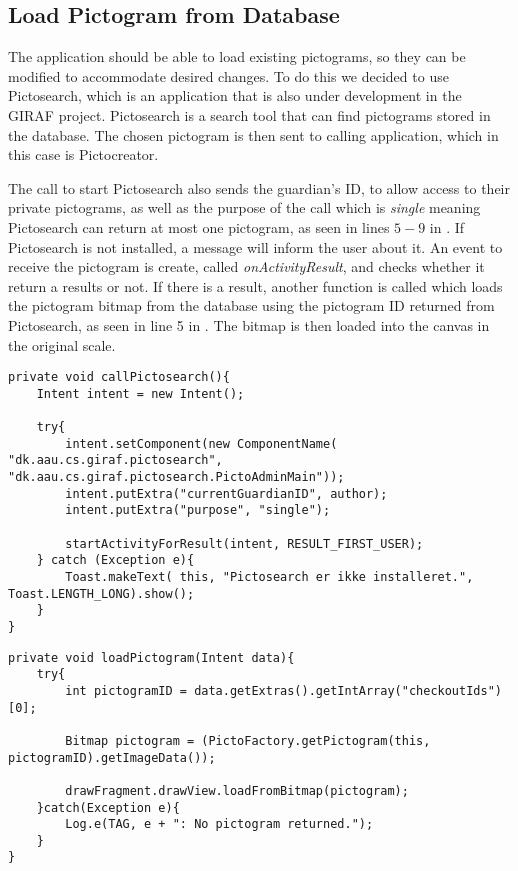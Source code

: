 \subsection{Load Pictogram from Database}
The application should be able to load existing pictograms, so they can be modified to accommodate desired changes.
To do this we decided to use Pictosearch, which is an application that is also under development in the GIRAF project.
Pictosearch is a search tool that can find pictograms stored in the database.
The chosen pictogram is then sent to calling application, which in this case is Pictocreator.

The call to start Pictosearch also sends the guardian's ID, to allow access to their private pictograms, as well as the purpose of the call which is \textit{single} meaning Pictosearch can return at most one pictogram, as seen in lines $5-9$ in .
If Pictosearch is not installed, a message will inform the user about it.
An event to receive the pictogram is create, called \textit{onActivityResult}, and checks whether it return a results or not.
If there is a result, another function is called which loads the pictogram bitmap from the database using the pictogram ID returned from Pictosearch, as seen in line 5 in  .
The bitmap is then loaded into the canvas in the original scale.

\begin{lstlisting}[caption=Method used to launch Pictosearch., label=lst:callPictosearch]
private void callPictosearch(){
    Intent intent = new Intent();

    try{
        intent.setComponent(new ComponentName( "dk.aau.cs.giraf.pictosearch",  "dk.aau.cs.giraf.pictosearch.PictoAdminMain"));
        intent.putExtra("currentGuardianID", author);
        intent.putExtra("purpose", "single");

        startActivityForResult(intent, RESULT_FIRST_USER);
    } catch (Exception e){
        Toast.makeText( this, "Pictosearch er ikke installeret.", Toast.LENGTH_LONG).show();
    }
}
\end{lstlisting}

\begin{lstlisting}[caption=Method to load a pictogram from Id received from Pictosearch, label=lst:loadPictogram]
private void loadPictogram(Intent data){
    try{
        int pictogramID = data.getExtras().getIntArray("checkoutIds")[0];

        Bitmap pictogram = (PictoFactory.getPictogram(this, pictogramID).getImageData());

        drawFragment.drawView.loadFromBitmap(pictogram);
    }catch(Exception e){
        Log.e(TAG, e + ": No pictogram returned.");
    }
}
\end{lstlisting}


